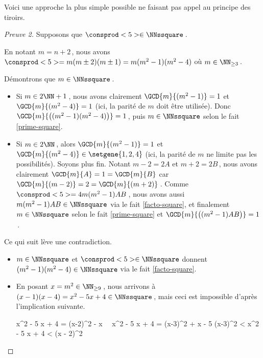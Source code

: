 

Voici une approche la plus simple possible ne faisant pas appel au principe des tiroirs.


\begin{proof}[Preuve 2]
	Supposons que $\consprod<5> \in \NNssquare$\,.
    
    \smallskip
    
	En notant $m = n+2$\,, nous avons $\consprod<5> = m (m \pm 2) (m \pm 1) = m (m^2 - 1) (m^2 - 4)$ où $m \in \NN_{\geq 3}$\,.
    
	\newpage
    
    Démontrons que $m \in \NNssquare$\,.
	\begin{itemize}
		\item Si $m \in 2 \NN + 1$\,, nous avons clairement $\GCD{m}{(m^2 - 1)} = 1$ et $\GCD{m}{(m^2 - 4)} = 1$ (ici, la parité de $m$ doit être utilisée).
		Donc $\GCD{m}{\big( (m^2 - 1) (m^2 - 4) \big)} = 1$\,, puis $m \in \NNssquare$ selon le fait \ref{prime-square}.

		\item Si $m \in 2 \NN$\,, alors $\GCD{m}{(m^2 - 1)} = 1$ et $\GCD{m}{(m^2 - 4)} \in \setgene{1, 2, 4}$ (ici, la parité de $m$ ne limite pas les possibilités). Soyons plus fin.
		Notant $m - 2 = 2A$ et $m + 2 = 2B$\,, nous avons clairement $\GCD{m}{A} = 1 = \GCD{m}{B}$ car $\GCD{m}{(m - 2)} = 2 = \GCD{m}{(m + 2)}$\,.
		Comme $\consprod<5> = 4 m (m^2 - 1) A B$\,, nous avons aussi $m (m^2 - 1) A B \in \NNssquare$ via le fait \ref{facto-square}, et finalement $m \in \NNssquare$ selon le fait \ref{prime-square} et $\GCD{m}{\big( (m^2 - 1) A B \big)} = 1$\,. 
	\end{itemize}
    
    \medskip
    
    Ce qui suit lève une contradiction.
	\begin{itemize}
		\item $m \in \NNssquare$ et $\consprod<5> \in \NNssquare$ donnent $(m^2 - 1) (m^2 - 4) \in \NNssquare$ via le fait \ref{facto-square}. 

		\item En posant $x = m^2 \in \NN_{\geq 9}$\,, nous arrivons à $(x - 1) (x - 4) = x^2 - 5 x + 4 \in \NNssquare$\,, mais ceci est impossible d'après l'implication suivante.
		
		\noindent\kern-10pt%
		\begin{stepcalc}[style=ar*, ope={\implies}]
			x^2 - 5 x + 4 = (x-2)^2 - x
			\,\,\,\,
			x^2 - 5 x + 4 = (x-3)^2 + x - 5
			(x-3)^2 < x^2 - 5 x + 4 < (x - 2)^2
		\end{stepcalc}
	\end{itemize}

    \vspace{-1.5ex}
    \qedhere
\end{proof}


